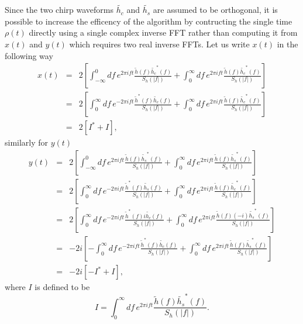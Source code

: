Since the two chirp waveforms $\tilde{h_c}$ and $\tilde{h_s}$ are assumed to
be orthogonal, it is possible to increase the efficency of the algorithm by
contructing the single time $\rho(t)$ directly using a single complex inverse
FFT rather than computing it from $x(t)$ and $y(t)$ which requires two real
inverse FFTs. Let us write $x(t)$ in the following way
\begin{eqnarray}
x(t) 
&=& 2 \left[ 
\int_{-\infty}^{0} df\, e^{2\pi i f t} \frac{\tilde{h}(f)
\tilde{h_c}^\ast(f)}{S_h\left(\left|f\right|\right)}
+ \int_{0}^{\infty} df\, e^{2\pi i f t} \frac{\tilde{h}(f)
\tilde{h_c}^\ast(f)}{S_h\left(\left|f\right|\right)} 
\right] \\
&=& 2 \left[ 
\int_{0}^{\infty} df\, e^{-2\pi i f t} \frac{\tilde{h}^\ast(f)
\tilde{h_c}(f)}{S_h\left(\left|f\right|\right)}
+ \int_{0}^{\infty} df\, e^{2\pi i f t} \frac{\tilde{h}(f)
\tilde{h_c}^\ast(f)}{S_h\left(\left|f\right|\right)} 
\right] \\
&=& 2 \left[ I^\ast + I \right],
\end{eqnarray}
similarly for $y(t)$
\begin{eqnarray}
y(t) 
&=& 2 \left[ 
\int_{-\infty}^{0} df\, e^{2\pi i f t} \frac{\tilde{h}(f)
\tilde{h_s}^\ast(f)}{S_h\left(\left|f\right|\right)}
+ \int_{0}^{\infty} df\, e^{2\pi i f t} \frac{\tilde{h}(f)
\tilde{h_s}^\ast(f)}{S_h\left(\left|f\right|\right)} 
\right] \\
&=& 2 \left[ 
\int_{0}^{\infty} df\, e^{-2\pi i f t} \frac{\tilde{h}^\ast(f)
\tilde{h_s}(f)}{S_h\left(\left|f\right|\right)}
+ \int_{0}^{\infty} df\, e^{2\pi i f t} \frac{\tilde{h}(f)
\tilde{h_c}^\ast(f)}{S_h\left(\left|f\right|\right)} 
\right] \\
&=& 2 \left[ 
\int_{0}^{\infty} df\, e^{-2\pi i f t} \frac{\tilde{h}^\ast(f)
i\tilde{h_c}(f)}{S_h\left(\left|f\right|\right)}
+ \int_{0}^{\infty} df\, e^{2\pi i f t} \frac{\tilde{h}(f)
(-i)\tilde{h_s}^\ast(f)}{S_h\left(\left|f\right|\right)} 
\right] \\
&=& -2i \left[ 
- \int_{0}^{\infty} df\, e^{-2\pi i f t} \frac{\tilde{h}^\ast(f)
\tilde{h_c}(f)}{S_h\left(\left|f\right|\right)}
+ \int_{0}^{\infty} df\, e^{2\pi i f t} \frac{\tilde{h}(f)
\tilde{h_s}^\ast(f)}{S_h\left(\left|f\right|\right)} 
\right] \\
&=& -2i \left[ - I^\ast + I \right],
\end{eqnarray}
where $I$ is defined to be
\begin{equation}
I = \int_{0}^{\infty} df\, e^{2\pi i f t}\frac{\tilde{h}(f)
\tilde{h_s}^\ast(f)}{S_h\left(\left|f\right|\right)}.
\end{equation}
